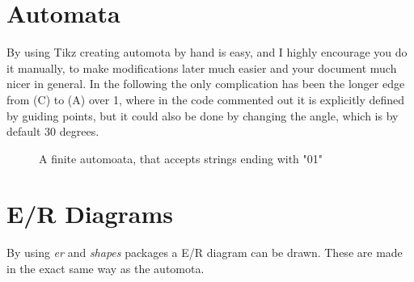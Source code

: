 \documentclass[a4, english, twoside]{article}
\begin{document}
\section{Automata}
By using Tikz creating automota by hand is easy, and I highly encourage you do it manually, to make modifications later much easier and your document much nicer in general. In the following the only complication has been the longer edge from (C) to (A) over 1, where in the code commented out it is explicitly defined by guiding points, but it could also be done by changing the angle, which is by default 30 degrees.
\begin{figure}[htbp]
    \centering
    \caption{A finite automoata, that accepts strings ending with "01"}
    \label{fig:FA}
\end{figure}

\newpage
\section{E/R Diagrams} \label{sec:ER}
By using \emph{er} and \emph{shapes} packages a E/R diagram can be drawn. These are made in the exact same way as the automota.
\end{document}
